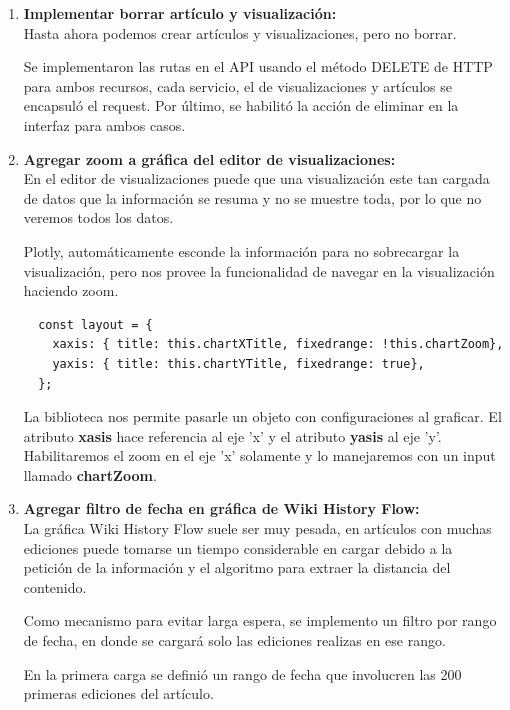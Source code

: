 \begin{enumerate}
  \item\textbf{Implementar borrar artículo y visualización:}\\
  
  Hasta ahora podemos crear artículos y visualizaciones, pero no borrar.
  
  Se implementaron las rutas en el API usando el método DELETE de HTTP para ambos recursos, cada servicio, el de visualizaciones y artículos se encapsuló el request. Por último, se habilitó la acción de eliminar en la interfaz para ambos casos.
  
  \item\textbf{Agregar zoom a gráfica del editor de visualizaciones:}\\

  En el editor de visualizaciones puede que una visualización este tan cargada de datos que la información se resuma y no se muestre toda, por lo que no veremos todos los datos.
  
  
  Plotly, automáticamente esconde la información para no sobrecargar la visualización, pero nos provee la funcionalidad de navegar en la visualización haciendo zoom.
  
  \begin{verbatim}
  const layout = {
    xaxis: { title: this.chartXTitle, fixedrange: !this.chartZoom},
    yaxis: { title: this.chartYTitle, fixedrange: true},
  };
  \end{verbatim}
  
  La biblioteca nos permite pasarle un objeto con configuraciones al graficar. El atributo \textbf{xasis} hace referencia al eje 'x' y el atributo \textbf{yasis} al eje 'y'. Habilitaremos el zoom en el eje 'x' solamente y lo manejaremos con un input llamado \textbf{chartZoom}.
  
  \item\textbf{Agregar filtro de fecha en gráfica de Wiki History Flow:}\\
  
  La gráfica Wiki History Flow suele ser muy pesada, en artículos con muchas ediciones puede tomarse un tiempo considerable en cargar debido a la petición de la información y el algoritmo para extraer la distancia del contenido.
  
  Como mecanismo para evitar larga espera, se implemento un filtro por rango de fecha, en donde se cargará solo las ediciones realizas en ese rango.
  
  En la primera carga se definió un rango de fecha que involucren las 200 primeras ediciones del artículo.


\end{enumerate}
